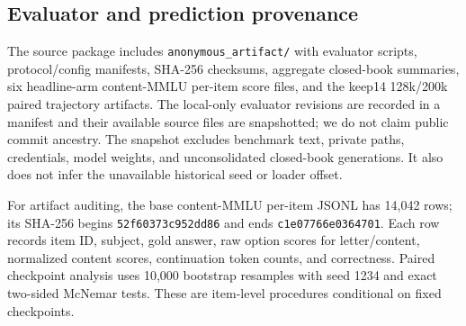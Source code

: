 \subsection{Evaluator and prediction provenance}
The source package includes \texttt{anonymous\_artifact/} with evaluator
scripts, protocol/config manifests, SHA-256 checksums, aggregate closed-book
summaries, six headline-arm content-MMLU per-item score files, and the keep14
128k/200k paired trajectory artifacts. The local-only evaluator revisions are
recorded in a manifest and their available source files are snapshotted; we do
not claim public commit ancestry. The snapshot excludes benchmark text, private
paths, credentials, model weights, and unconsolidated closed-book generations.
It also does not infer the unavailable historical seed or loader offset.

For artifact auditing, the base content-MMLU per-item JSONL has 14,042 rows;
its SHA-256 begins \texttt{52f60373c952dd86} and ends
\texttt{c1e07766e0364701}. Each row records
item ID, subject, gold answer, raw option scores for letter/content, normalized
content scores, continuation token counts, and correctness. Paired checkpoint
analysis uses 10,000 bootstrap resamples with seed 1234 and exact two-sided
McNemar tests. These are item-level procedures conditional on fixed checkpoints.



